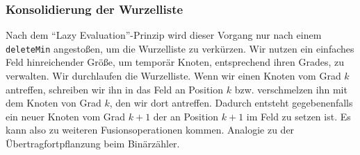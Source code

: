 \subsubsection{Konsolidierung der Wurzelliste}
Nach dem "`Lazy Evaluation"'-Prinzip wird dieser Vorgang nur nach einem \texttt{deleteMin} angestoßen, um die Wurzelliste zu verkürzen. Wir nutzen ein einfaches Feld hinreichender Größe, um temporär Knoten, entsprechend ihren Grades, zu verwalten. Wir durchlaufen die Wurzelliste. Wenn wir einen Knoten vom Grad $k$ antreffen, schreiben wir ihn in das Feld an Position $k$ bzw. verschmelzen ihn mit dem Knoten von Grad $k$, den wir dort antreffen. Dadurch entsteht gegebenenfalls ein neuer Knoten vom Grad $k+1$ der an Position $k+1$ im Feld zu setzen ist. Es kann also zu weiteren Fusionsoperationen kommen. Analogie zu der Übertragfortpflanzung beim Binärzähler.